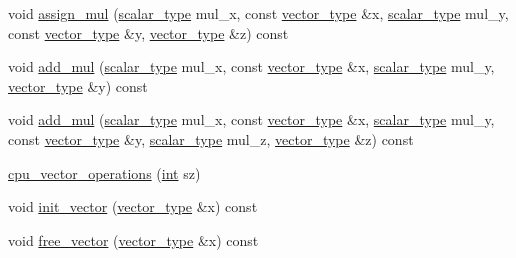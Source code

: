 \begin{DoxyCompactItemize}
\item 
void \hyperlink{structcpu__vector__operations_a163796b0326ebdd18f2711469783f1a1}{assign\-\_\-mul} (\hyperlink{structcpu__vector__operations_aca6b216aa1fb172df83d98350e94fd61}{scalar\-\_\-type} mul\-\_\-x, const \hyperlink{structcpu__vector__operations_a1962836df596ce262704d208e9a6d8f9}{vector\-\_\-type} \&x, \hyperlink{structcpu__vector__operations_aca6b216aa1fb172df83d98350e94fd61}{scalar\-\_\-type} mul\-\_\-y, const \hyperlink{structcpu__vector__operations_a1962836df596ce262704d208e9a6d8f9}{vector\-\_\-type} \&y, \hyperlink{structcpu__vector__operations_a1962836df596ce262704d208e9a6d8f9}{vector\-\_\-type} \&z) const 
\item 
void \hyperlink{structcpu__vector__operations_a19a2b91881a13f4b4372164aecc3fb67}{add\-\_\-mul} (\hyperlink{structcpu__vector__operations_aca6b216aa1fb172df83d98350e94fd61}{scalar\-\_\-type} mul\-\_\-x, const \hyperlink{structcpu__vector__operations_a1962836df596ce262704d208e9a6d8f9}{vector\-\_\-type} \&x, \hyperlink{structcpu__vector__operations_aca6b216aa1fb172df83d98350e94fd61}{scalar\-\_\-type} mul\-\_\-y, \hyperlink{structcpu__vector__operations_a1962836df596ce262704d208e9a6d8f9}{vector\-\_\-type} \&y) const 
\item 
void \hyperlink{structcpu__vector__operations_a6fa2370a0e2623c5ecc75e149cfda4d7}{add\-\_\-mul} (\hyperlink{structcpu__vector__operations_aca6b216aa1fb172df83d98350e94fd61}{scalar\-\_\-type} mul\-\_\-x, const \hyperlink{structcpu__vector__operations_a1962836df596ce262704d208e9a6d8f9}{vector\-\_\-type} \&x, \hyperlink{structcpu__vector__operations_aca6b216aa1fb172df83d98350e94fd61}{scalar\-\_\-type} mul\-\_\-y, const \hyperlink{structcpu__vector__operations_a1962836df596ce262704d208e9a6d8f9}{vector\-\_\-type} \&y, \hyperlink{structcpu__vector__operations_aca6b216aa1fb172df83d98350e94fd61}{scalar\-\_\-type} mul\-\_\-z, \hyperlink{structcpu__vector__operations_a1962836df596ce262704d208e9a6d8f9}{vector\-\_\-type} \&z) const 
\item 
\hyperlink{structcpu__vector__operations_ac5f2995a40bfdf6cc126adfbb5e81f93}{cpu\-\_\-vector\-\_\-operations} (\hyperlink{classint}{int} sz)
\item 
void \hyperlink{structcpu__vector__operations_a8e3da0067d3368df889f4559ca5df94c}{init\-\_\-vector} (\hyperlink{structcpu__vector__operations_a1962836df596ce262704d208e9a6d8f9}{vector\-\_\-type} \&x) const 
\item 
void \hyperlink{structcpu__vector__operations_ab611343789ba4dab20b9d162b4963789}{free\-\_\-vector} (\hyperlink{structcpu__vector__operations_a1962836df596ce262704d208e9a6d8f9}{vector\-\_\-type} \&x) const 

\end{DoxyCompactItemize}
